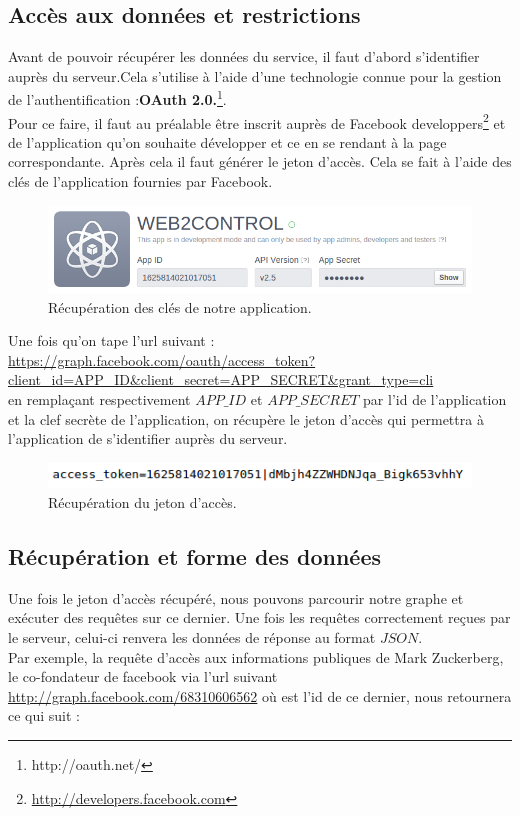 \subsection{Accès aux données et restrictions}
Avant de pouvoir récupérer les données du service, il faut d'abord s'identifier auprès du serveur.Cela s'utilise à l'aide d'une technologie connue pour la gestion de l'authentification :\textbf{OAuth 2.0.}\footnote{http://oauth.net/}. \\
Pour ce faire, il faut au préalable être inscrit auprès de Facebook developpers\footnote{\url{http://developers.facebook.com}} et de l'application qu'on souhaite développer et ce en se rendant à la page correspondante.
Après cela il faut générer le jeton d'accès.
Cela se fait à l'aide des clés de l'application fournies par Facebook.

\begin{figure}[!h]
\begin{center}
\includegraphics[scale=0.4]{web2c_app.png}
\caption{Récupération des clés de notre application.}
\label{ID_web2c}
\end{center}
\end{figure}

 Une fois qu'on tape l'url suivant : 
 \url{https://graph.facebook.com/oauth/access_token?client_id=APP_ID&client_secret=APP_SECRET&grant_type=cli}\\
 en remplaçant respectivement $APP\_ID$ et $APP\_SECRET$ par l'id de l'application et la clef secrète de l'application, on récupère le jeton d'accès qui permettra à l'application de s'identifier auprès du serveur.\\
 
\begin{figure}[!h]
\begin{center}
\includegraphics[scale=0.6]{token_access.png}
\caption{Récupération du jeton d'accès.}
\end{center}
\end{figure}

\subsection{Récupération et forme des données}
Une fois le jeton d'accès récupéré, nous pouvons parcourir notre graphe et exécuter des requêtes sur ce dernier. Une fois les requêtes correctement reçues par le serveur, celui-ci renvera les données de réponse au format $JSON$. \\
Par exemple, la requête d'accès aux informations publiques de Mark Zuckerberg, le co-fondateur de facebook via l'url suivant \url{http://graph.facebook.com/68310606562} où est l'id de ce dernier, nous retournera ce qui suit : 


